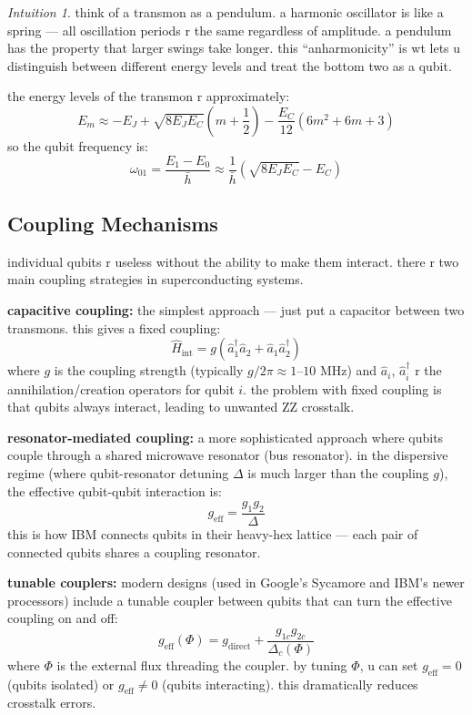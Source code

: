 \documentclass[11pt,a4paper]{article}
\theoremstyle{definition}
\theoremstyle{remark}
\newtheorem*{intuition}{Intuition}
\begin{document}
\begin{intuition}
think of a transmon as a pendulum. a harmonic oscillator is like a spring --- all oscillation periods r the same regardless of amplitude. a pendulum has the property that larger swings take longer. this ``anharmonicity'' is wt lets u distinguish between different energy levels and treat the bottom two as a qubit.
\end{intuition}

the energy levels of the transmon r approximately:
\[
E_m \approx -E_J + \sqrt{8E_J E_C}\left(m + \frac{1}{2}\right) - \frac{E_C}{12}(6m^2 + 6m + 3)
\]
so the qubit frequency is:
\[
\omega_{01} = \frac{E_1 - E_0}{\bar{h}} \approx \frac{1}{\bar{h}}\left(\sqrt{8E_J E_C} - E_C\right)
\]

\subsection{Coupling Mechanisms}

individual qubits r useless without the ability to make them interact. there r two main coupling strategies in superconducting systems.

\textbf{capacitive coupling:} the simplest approach --- just put a capacitor between two transmons. this gives a fixed coupling:
\[
\hat{H}_{\text{int}} = g(\hat{a}_1^\dagger \hat{a}_2 + \hat{a}_1 \hat{a}_2^\dagger)
\]
where $g$ is the coupling strength (typically $g/2\pi \approx 1$--$10$ MHz) and $\hat{a}_i$, $\hat{a}_i^\dagger$ r the annihilation/creation operators for qubit $i$. the problem with fixed coupling is that qubits always interact, leading to unwanted ZZ crosstalk.

\textbf{resonator-mediated coupling:} a more sophisticated approach where qubits couple through a shared microwave resonator (bus resonator). in the dispersive regime (where qubit-resonator detuning $\Delta$ is much larger than the coupling $g$), the effective qubit-qubit interaction is:
\[
g_{\text{eff}} = \frac{g_1 g_2}{\Delta}
\]
this is how IBM connects qubits in their heavy-hex lattice --- each pair of connected qubits shares a coupling resonator.

\textbf{tunable couplers:} modern designs (used in Google's Sycamore and IBM's newer processors) include a tunable coupler between qubits that can turn the effective coupling on and off:
\[
g_{\text{eff}}(\Phi) = g_{\text{direct}} + \frac{g_{1c} g_{2c}}{\Delta_c(\Phi)}
\]
where $\Phi$ is the external flux threading the coupler. by tuning $\Phi$, u can set $g_{\text{eff}} = 0$ (qubits isolated) or $g_{\text{eff}} \neq 0$ (qubits interacting). this dramatically reduces crosstalk errors.
\end{document}
